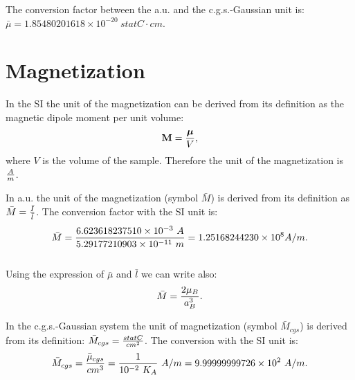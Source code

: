 \documentclass[12pt,a4paper]{article}
\def\barl{5.29177210903\times 10^{-11}}
\def\bari{6.623618237510\times 10^{-3}}
\def\barmag{1.25168244230\times 10^{8}}
\def\mutomu{9.99999999726\times 10^{-4}}
\def\magtomag{9.99999999726\times 10^{2}}
\def\barmucgs{1.85480201618\times 10^{-20}}
\begin{document}

{\color{green} 
The conversion factor between the a.u. and the c.g.s.-Gaussian unit is: 
$\bar \mu = \barmucgs\ statC\cdot cm$.
}

\newpage
\section{\color{coral}Magnetization}
In the SI the unit of the magnetization can be derived from its definition
as the magnetic dipole moment per unit volume:
\begin{equation}
{\bf M} = {{\boldsymbol \mu}\over V},
\end{equation}
where $V$ is the volume of the sample.
Therefore the unit of the magnetization is $A\over m$.  

{\color{web-blue} In a.u. the unit of the magnetization 
(symbol $\bar M$) is derived from its definition
as $\bar M= {\bar I \over \bar l}$. The conversion factor with
the SI unit is:
\begin{equation}
\bar M = {\bari\ A \over \barl\ m} = \barmag A/m.
\end{equation}
\\
Using the expression of $\bar \mu$ and $\bar l$ we can write also:
\begin{equation}
\bar M = {2 \mu_B \over a_B^3}.
\end{equation}
}

{\color{orange} In the c.g.s.-Gaussian system the unit of magnetization
(symbol $\bar M_{cgs}$) is derived from its definition: 
$\bar M_{cgs}={statC \over cm^2}$.
The conversion with the SI unit is:
\begin{equation}
\bar M_{cgs} = {\bar \mu_{cgs} \over cm^3}={1\over 10^{-2}\ K_A}\ A/m =
\magtomag\ A/m.
\end{equation}
}
\\
\end{document}
